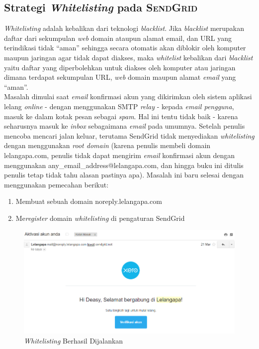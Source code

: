 \newpage
\subsection{Strategi \textit{Whitelisting} pada \textsc{SendGrid}}
	\textit{Whitelisting} adalah kebalikan dari teknologi \textit{blacklist}. Jika \textit{blacklist} merupakan daftar dari sekumpulan \textit{web} domain ataupun alamat email, dan URL yang terindikasi tidak “aman” sehingga secara otomatis akan diblokir oleh komputer maupun jaringan agar tidak dapat diakses, maka \textit{whitelist} kebalikan dari \textit{blacklist} yaitu daftar yang diperbolehkan untuk diakses oleh komputer atau jaringan dimana terdapat sekumpulan URL, \textit{web} domain maupun alamat \textit{email} yang “aman”.\\
	\indent Masalah dimulai saat \textit{email} konfirmasi akun yang dikirimkan oleh sistem aplikasi lelang \textit{online} - dengan menggunakan SMTP \textit{relay} - kepada \textit{email pengguna}, masuk ke dalam kotak pesan sebagai \textit{spam}. Hal ini tentu tidak baik - karena seharusnya masuk ke \textit{inbox} sebagaimana \textit{email} pada umumnya. Setelah penulis mencoba mencari jalan keluar, terutama SendGrid tidak menyediakan \textit{whitelisting} dengan menggunakan \textit{root domain} (karena penulis membeli domain lelangapa.com, penulis tidak dapat mengirim \textit{email} konfirmasi akun dengan menggunakan any\_email\_address@lelangapa.com, dan hingga buku ini ditulis penulis tetap tidak tahu alasan pastinya apa). Masalah ini baru selesai dengan menggunakan pemecahan berikut:
	\begin{enumerate}
		\item Membuat sebuah domain noreply.lelangapa.com
		\item Me\textit{register} domain \textit{whitelisting} di pengaturan SendGrid
	\end{enumerate}
	
	\begin{figure}[H]
		\centering
		\includegraphics[width=\textwidth]{images/bab4/pl/whitelist-success.png}
		\caption{\textit{Whitelisting} Berhasil Dijalankan}
		\label{whitelist-success}
	\end{figure}
	

